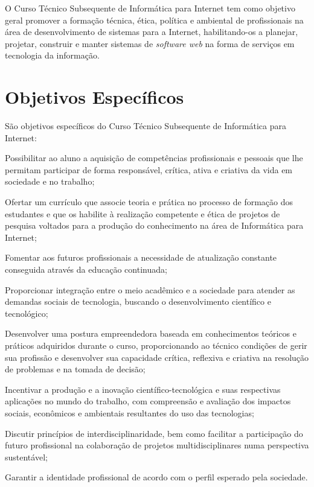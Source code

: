 \documentclass[
	12pt,				%
	openright,			%
	twoside,			%
	a4paper,			%
	chapter=TITLE,		%
	english,			%
	french,				%
	spanish,			%
	brazil,				%
	]{abntex2}
\begin{document}
O Curso Técnico Subsequente de Informática para Internet tem como objetivo geral promover a formação técnica, ética, política e ambiental de profissionais na área de desenvolvimento de sistemas para a Internet, habilitando-os a planejar, projetar, construir e manter sistemas de \textit{software web} na forma de serviços em tecnologia da informação.


\section{Objetivos Específicos}

São objetivos específicos do Curso Técnico Subsequente de Informática para Internet:
\begin{alineas}
    \item Possibilitar ao aluno a aquisição de competências profissionais e pessoais que lhe permitam participar de forma responsável, crítica, ativa e criativa da vida em sociedade e no trabalho;
    \item  Ofertar um currículo que associe teoria e prática no processo de formação dos estudantes e que os habilite à realização competente e ética de projetos de pesquisa voltados para a produção do conhecimento na área de Informática para Internet;
    \item  Fomentar aos futuros profissionais a necessidade de atualização constante conseguida através da educação continuada;
    \item  Proporcionar integração entre o meio acadêmico e a sociedade para atender as demandas sociais de tecnologia, buscando o desenvolvimento científico e tecnológico;
    \item  Desenvolver uma postura empreendedora baseada em conhecimentos teóricos e práticos adquiridos durante o curso, proporcionando ao técnico condições de gerir sua profissão e desenvolver sua capacidade crítica, reflexiva e criativa na resolução de problemas e na tomada de decisão;
    \item  Incentivar a produção e a inovação científico-tecnológica e suas respectivas aplicações no mundo do trabalho, com compreensão e avaliação dos impactos sociais, econômicos e ambientais resultantes do uso das tecnologias;
    \item Discutir  princípios de interdisciplinaridade, bem como facilitar a participação do futuro profissional na colaboração de projetos multidisciplinares numa perspectiva sustentável;
    \item Garantir a identidade profissional de acordo com o perfil esperado pela sociedade.
\end{alineas}
\end{document}

